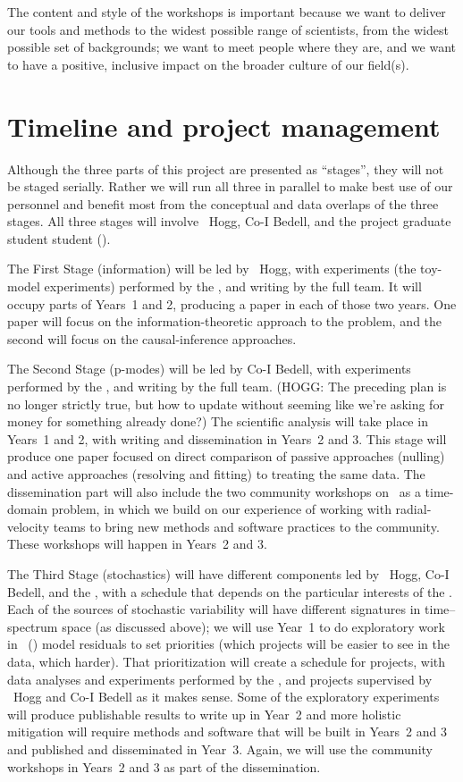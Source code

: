 \documentclass[12pt, letterpaper]{article}
\begin{document}
The content and style of the workshops is important because we want to deliver our tools and methods
to the widest possible range of scientists, from the widest possible set of
backgrounds; we want to meet people where they are, and we want
to have a positive, inclusive impact on the broader culture of our field(s).

\section{Timeline and project management}

Although the three parts of this project are presented as ``stages'',
they will not be staged serially.
Rather we will run all three in parallel to make best use of our
personnel and benefit most from the conceptual and data overlaps of the three stages.
All three stages will involve \PI\ Hogg, Co-I Bedell, and the project
graduate student student (\GRA). 

The First Stage (information) will be led by \PI\ Hogg, with experiments (the
toy-model experiments) performed by the \GRA, and writing by the full
team.
It will occupy parts of Years~1 and 2, producing a paper
in each of those two years.
One paper will focus on the information-theoretic approach to the problem,
and the second will focus on the causal-inference approaches.

The Second Stage (p-modes) will be led by Co-I Bedell, with
experiments performed by the \GRA, and writing by the full team.
(HOGG: The preceding plan is no longer strictly true, 
but how to update without seeming like we're asking for money for 
something already done?)
The scientific analysis will take place in Years~1 and 2, with
writing and dissemination in Years~2 and 3.
This stage will produce one paper focused on direct comparison of 
passive approaches (nulling) and active approaches (resolving
and fitting) to treating the same data. 
The dissemination part will also include the two community workshops on
\EPRV\ as a time-domain problem, in which we build on our experience
of working with radial-velocity teams to bring new methods and
software practices to the community.
These workshops will happen in Years~2 and 3.

The Third Stage (stochastics) will have different components led by \PI\ Hogg,
Co-I Bedell, and the \GRA, with a schedule that depends on the
particular interests of the \GRA.
Each of the sources of stochastic variability will have different
signatures in time--spectrum space (as discussed above); we will use
Year~1 to do exploratory work in \wobble\ (\citealt{Bedell2019})
model residuals to set priorities
(which projects will be easier to see in the data, which harder).
That prioritization will create a schedule for projects, with data
analyses and experiments performed by the \GRA, and projects supervised
by \PI\ Hogg and Co-I Bedell as it makes sense.
Some of the exploratory experiments will produce publishable results
to write up in Year~2 and more holistic mitigation will require
methods and software that will be built in Years~2 and 3 and published
and disseminated in Year~3.
Again, we will use the community workshops in Years~2 and 3 as part of
the dissemination.
\end{document}

